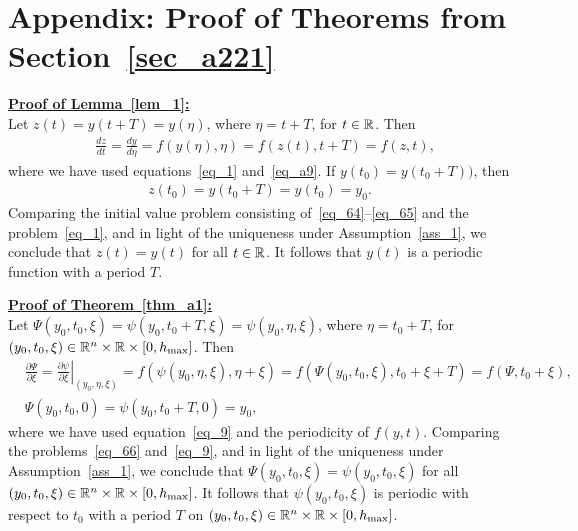 \section*{Appendix: Proof of Theorems from Section~\ref{sec_a221}}


\noindent\underline{\bf Proof of Lemma~\ref{lem_1}:}\\
Let $z(t)=y(t+T)=y(\eta)$, where $\eta=t+T$, for $t\in\mathbb{R}$. Then
\begin{align}\label{eq_64}
  &
  \frac{dz}{dt} = \frac{dy}{d\eta} = f(y(\eta),\eta) = f(z(t),t+T) = f(z,t),
\end{align}
where we have used equations~\eqref{eq_1} and~\eqref{eq_a9}.
If $y(t_0)=y(t_0+T))$, then
\begin{align}\label{eq_65}
  z(t_0) = y(t_0+T) = y(t_0)=y_0.
\end{align}
Comparing the initial value problem consisting of~\eqref{eq_64}--\eqref{eq_65} and the problem~\eqref{eq_1},
and in light of the uniqueness under Assumption~\ref{ass_1},
we conclude that $z(t)=y(t)$ for all $t\in\mathbb{R}$.
It follows that $y(t)$ is a periodic function with a period $T$.


\vspace{8pt}
\noindent\underline{\bf Proof of Theorem~\ref{thm_a1}:}\\
Let $\Psi(y_0,t_0,\xi)=\psi(y_0,t_0+T,\xi)=\psi(y_0,\eta,\xi)$,
where $\eta=t_0+T$, for
$(y_0,t_0,\xi)\in\mathbb{R}^n\times\mathbb{R}\times[0,h_{\max}]$.
Then
\begin{subequations}\label{eq_66}
  \begin{align}
    &
  \frac{\partial\Psi}{\partial\xi}
  = \left.\frac{\partial\psi}{\partial\xi}\right|_{(y_0,\eta,\xi)}
  = f(\psi(y_0,\eta,\xi),\eta+\xi)
  = f(\Psi(y_0,t_0,\xi),t_0+\xi+T) = f(\Psi,t_0+\xi), \\
  &
  \Psi(y_0,t_0,0) = \psi(y_0,t_0+T,0) = y_0,
\end{align}
\end{subequations}
where we have used equation~\eqref{eq_9} and the periodicity of $f(y,t)$.
Comparing the problems~\eqref{eq_66} and~\eqref{eq_9},
and in light of the uniqueness under Assumption~\ref{ass_1},
we conclude that $\Psi(y_0,t_0,\xi)=\psi(y_0,t_0,\xi)$
for all $(y_0,t_0,\xi)\in\mathbb{R}^n\times\mathbb{R}\times[0,h_{\max}]$.
It follows that $\psi(y_0,t_0,\xi)$ is periodic with respect to
$t_0$ with a period $T$
on $(y_0,t_0,\xi)\in\mathbb{R}^n\times\mathbb{R}\times[0,h_{\max}]$.

